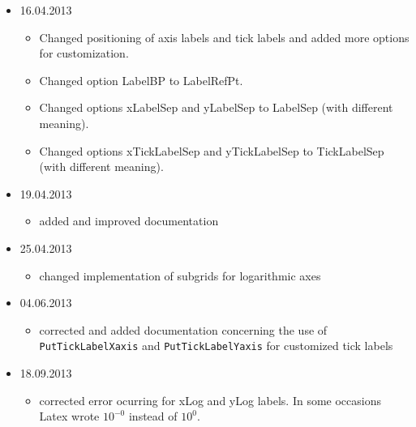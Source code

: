 \begin{itemize}
\begin{itemize}
   \item Corrected calculation of bounding box
     \begin{itemize}
     \item removed additional horizontal phantom space
		\item  Previously, the padding values lly and ury where added to the given
height parameter to set the object height. Now, the given height parameter is correctly set as height of the bounding box.
   \item new standard values for padding parameters lly, llx, ury, urx, which now take into account the current font size settings (unit \verb|em|, \verb|\baselineskip|)
     \end{itemize}
   \item added more detailed documentation of the bounding box and coordinate frame behavior 
   \end{itemize}
   \item 16.04.2013
   \begin{itemize}
   	\item Changed positioning of axis labels and tick labels and added more
   	options for customization.
   	\item Changed option LabelBP to LabelRefPt.
   	\item Changed options xLabelSep and yLabelSep to LabelSep (with different
   	meaning).
   	\item Changed options xTickLabelSep and yTickLabelSep to TickLabelSep (with
   	different meaning).
  \end{itemize}
  \item 19.04.2013
  \begin{itemize}
  	\item added and improved documentation
  \end{itemize}
  \item 25.04.2013
  \begin{itemize}
  	\item changed implementation of subgrids for logarithmic axes
  \end{itemize}
  \item 04.06.2013
  \begin{itemize}
  	\item corrected and added documentation concerning the use of \verb|PutTickLabelXaxis| and \verb|PutTickLabelYaxis| for customized tick labels
  \end{itemize}
  \item 18.09.2013
  \begin{itemize}
  	\item corrected error ocurring for xLog and yLog labels. In some occasions
  	Latex wrote $10^{-0}$ instead of $10^{0}$.
  \end{itemize}
\end{itemize} 
